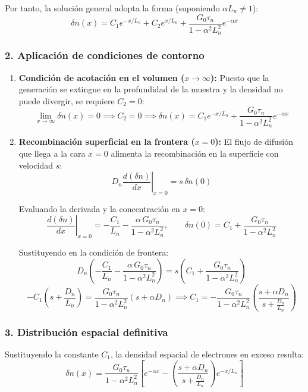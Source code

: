 \begin{problema}
Por tanto, la solución general adopta la forma (suponiendo $\alpha L_n \neq 1$):
\[
\delta n(x) = C_1 e^{-x/L_n} + C_2 e^{x/L_n} + \frac{G_0 \tau_n}{1 - \alpha^2 L_n^2} e^{-\alpha x}
\]

\subsubsection*{2. Aplicación de condiciones de contorno}
\begin{enumerate}[label=\arabic*.]
    \item \textbf{Condición de acotación en el volumen ($x \to \infty$):}
    Puesto que la generación se extingue en la profundidad de la muestra y la densidad no puede divergir, se requiere $C_2 = 0$:
    \[
    \lim_{x \to \infty} \delta n(x) = 0 \implies C_2 = 0 \implies \delta n(x) = C_1 e^{-x/L_n} + \frac{G_0 \tau_n}{1 - \alpha^2 L_n^2} e^{-\alpha x}
    \]

    \item \textbf{Recombinación superficial en la frontera ($x = 0$):}
    El flujo de difusión que llega a la cara $x = 0$ alimenta la recombinación en la superficie con velocidad $s$:
    \[
    D_n \left. \frac{d(\delta n)}{dx} \right|_{x=0} = s \, \delta n(0)
    \]

    Evaluando la derivada y la concentración en $x = 0$:
    \[
    \left. \frac{d(\delta n)}{dx} \right|_{x=0} = -\frac{C_1}{L_n} - \frac{\alpha \, G_0 \tau_n}{1 - \alpha^2 L_n^2}, \qquad \delta n(0) = C_1 + \frac{G_0 \tau_n}{1 - \alpha^2 L_n^2}
    \]

    Sustituyendo en la condición de frontera:
    \[
    D_n \left( -\frac{C_1}{L_n} - \frac{\alpha \, G_0 \tau_n}{1 - \alpha^2 L_n^2} \right) = s \left( C_1 + \frac{G_0 \tau_n}{1 - \alpha^2 L_n^2} \right)
    \]
    \[
    -C_1 \left( s + \frac{D_n}{L_n} \right) = \frac{G_0 \tau_n}{1 - \alpha^2 L_n^2} \left( s + \alpha D_n \right) \implies C_1 = -\frac{G_0 \tau_n}{1 - \alpha^2 L_n^2} \left( \frac{s + \alpha D_n}{s + \frac{D_n}{L_n}} \right)
    \]
\end{enumerate}

\subsubsection*{3. Distribución espacial definitiva}
Sustituyendo la constante $C_1$, la densidad espacial de electrones en exceso resulta:
\[
\delta n(x) = \frac{G_0 \tau_n}{1 - \alpha^2 L_n^2} \left[ e^{-\alpha x} - \left( \frac{s + \alpha D_n}{s + \frac{D_n}{L_n}} \right) e^{-x/L_n} \right]
\]


\end{problema}
